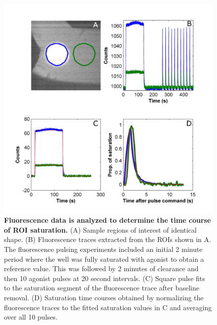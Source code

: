   \begin{figure}[!htb]
       \centering
       \includegraphics[width=15cm]{chapter6/figures/fluoAnalysis/fluoAnalysis.jpg}
       \caption[Analysis pipeline of fluorescence pulsing data]{\textbf{Fluorescence data is analyzed to determine the time course of ROI saturation.} (A) Sample regions of interest of identical shape. (B) Fluorescence traces extracted from the ROIs shown in A. The fluorescence pulsing experiments included an initial 2 minute period where the well was fully saturated with agonist to obtain a reference value. This was followed by 2 minutes of clearance and then 10 agonist pulses at 20 second intervals. (C) Square pulse fits to the saturation segment of the fluorescence trace after baseline removal. (D) Saturation time courses obtained by normalizing the fluorescence traces to the fitted saturation values in C and averaging over all 10 pulses.}
       \label{fig:pulses:fluoAnalysis}
  \end{figure}

